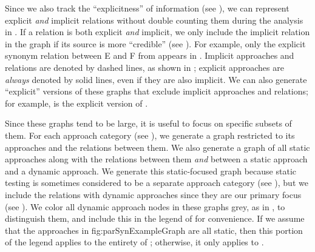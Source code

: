     \label{graphExplicit}
    Since we also track the ``explicitness'' of information
    (see ), we can represent explicit
    \emph{and} implicit relations without double counting them during the
    analysis in . If a relation is both explicit
    \emph{and} implicit, we only include the implicit relation in the graph
    if its source is more ``credible'' (see ).
    For example, only the explicit synonym relation between E and F
    from  appears in .
    Implicit approaches and relations are denoted by dashed lines, as shown
    in ; explicit approaches are
    \emph{always} denoted by solid lines, even if they are also implicit.
    We can also generate ``explicit'' versions of these graphs that exclude
    implicit approaches and relations; for example, 
    is the explicit version of .

\fi
Since these graphs tend to be large, it is useful to focus on specific
subsets of them. \ifnotpaper For each approach category (see
    ), we generate a graph restricted to its approaches
    and the relations between them. We also generate a graph of all static
    approaches along with the relations between them \emph{and} between a
    static approach and a dynamic approach. We generate this static-focused
    graph because static testing is sometimes considered to be a separate
    approach category (see ), but we include the
    relations with dynamic approaches since they are our primary focus
    (see ). We color all dynamic approach nodes in these
    graphs grey, as in , to distinguish them,
    and include this in the legend of  for convenience.
    If we assume that the approaches in 
    {fig:parSynExampleGraph} are all static, then this portion of the legend
    applies to the entirety of ; otherwise, it only
    applies to .


